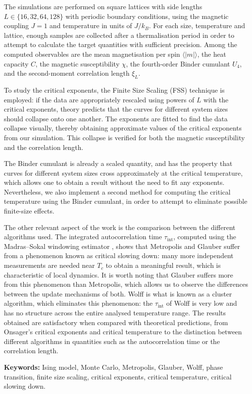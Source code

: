 The simulations are performed on square lattices with side lengths $L\in \{16,32,64,128\}$ with periodic boundary conditions, using the magnetic coupling $J=1$ and temperature in units of $J/k_B$. For each size, temperature and lattice, enough samples are collected after a thermalisation period in order to attempt to calculate the target quantities with sufficient precision. Among the computed observables are the mean magnetisation per spin $\langle |m| \rangle$, the heat capacity $C$, the magnetic susceptibility $\chi$, the fourth-order Binder cumulant $U_4$, and the second-moment correlation length $\xi_L$.

To study the critical exponents, the Finite Size Scaling (FSS) technique is employed: if the data are appropriately rescaled using powers of $L$ with the critical exponents, theory predicts that the curves for different system sizes should collapse onto one another. The exponents are fitted to find the data collapse visually, thereby obtaining approximate values of the critical exponents from our simulation. This collapse is verified for both the magnetic susceptibility and the correlation length.

The Binder cumulant is already a scaled quantity, and has the property that curves for different system sizes cross approximately at the critical temperature, which allows one to obtain a result without the need to fit any exponents. Nevertheless, we also implement a second method for computing the critical temperature using the Binder cumulant, in order to attempt to eliminate possible finite-size effects.

The other relevant aspect of the work is the comparison between the different algorithms used. The integrated autocorrelation time $\tau_{\text{int}}$, computed using the Madras--Sokal windowing estimator \citep{Madras1988}, shows that Metropolis and Glauber suffer from a phenomenon known as critical slowing down: many more independent measurements are needed near $T_c$ to obtain a meaningful result, which is characteristic of local dynamics. It is worth noting that Glauber suffers more from this phenomenon than Metropolis, which allows us to observe the differences between the update mechanisms of both. Wolff is what is known as a cluster algorithm, which eliminates this phenomenon: the $\tau_{\text{int}}$ of Wolff is very low and has no structure across the entire analysed temperature range.
The results obtained are satisfactory when compared with theoretical predictions, from Onsager's critical exponents and critical temperature to the distinction between different algorithms in quantities such as the autocorrelation time or the correlation length.

\textbf{Keywords:} Ising model, Monte Carlo, Metropolis, Glauber, Wolff, phase transition, finite size scaling, critical exponents, critical temperature, critical slowing down.